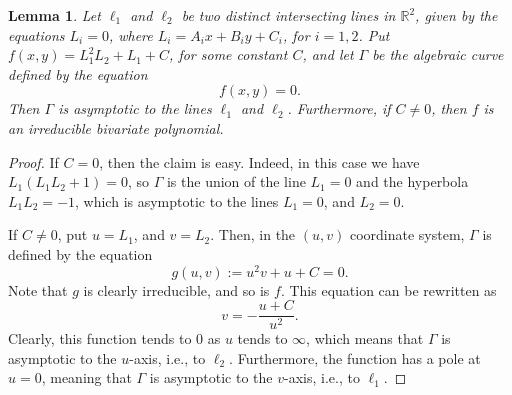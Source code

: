 \documentclass[12pt]{article}
\def\reals{{\mathbb R}}
\newtheorem{lemma}[theorem]{Lemma}
\begin{document}
\begin{lemma} \label{lem:as2}
Let $\ell_1$ and $\ell_2$ be two distinct intersecting lines in
$\reals^2$, given by the equations $L_i = 0$, where
$L_i = A_i x + B_i y + C_i$, for $i = 1,2$.
Put $f(x,y) = L_1^2 L_2 + L_1 + C$, for some constant $C$, and
let $\Gamma$ be the algebraic curve defined by the equation
\[
f(x,y) = 0.
\]
Then $\Gamma$ is asymptotic to the lines $\ell_1$ and $\ell_2$.
Furthermore, if $C \ne 0$, then $f$ is an irreducible bivariate
polynomial.
\end{lemma}
\begin{proof}
If $C = 0$, then the claim is easy. Indeed, in this case we
have $L_1(L_1L_2 + 1) = 0$, so $\Gamma$ is the union of the line
$L_1 = 0$ and the hyperbola $L_1L_2 = -1$, which is asymptotic to
the lines $L_1 = 0$, and $L_2 = 0$.

If $C \ne 0$, put $u = L_1$, and $v = L_2$. Then, in the $(u,v)$
coordinate system, $\Gamma$ is defined by the equation
\[
g(u,v) := u^2v + u + C = 0.
\]
Note that $g$ is clearly irreducible, and so is $f$.
This equation can be rewritten as
\[
v = -\frac{u+C}{u^2}.
\]
Clearly, this function tends to 0 as $u$ tends to $\infty$, which
means that $\Gamma$ is asymptotic to the $u$-axis, i.e.,
to $\ell_2$.
Furthermore, the function has a pole at $u = 0$, meaning that
$\Gamma$ is asymptotic to the $v$-axis, i.e., to $\ell_1$.
\end{proof}
\end{document}
